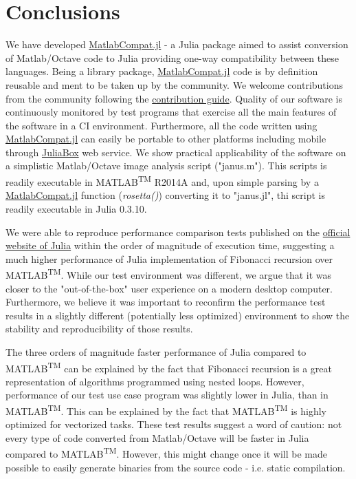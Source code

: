\section{Conclusions}

We have developed \href{https://github.com/MatlabCompat/MatlabCompat.jl}{MatlabCompat.jl} - a Julia package aimed to assist conversion of Matlab/Octave code to Julia providing one-way compatibility between these languages. Being a library package, \href{https://github.com/MatlabCompat/MatlabCompat.jl}{MatlabCompat.jl} code is by definition reusable and ment to be taken up by the community. We welcome contributions from the community following the \href{http://matlabcompat.github.io/contribute.html}{contribution guide}. Quality of our software is continuously monitored by test programs that exercise all the main features of the software in a CI environment. Furthermore, all the code written using \href{https://github.com/MatlabCompat/MatlabCompat.jl}{MatlabCompat.jl} can easily be portable to other platforms including mobile through \href{https://www.juliabox.org/}{JuliaBox} web service. We show practical applicability of the software on a simplistic Matlab/Octave image analysis script ("janus.m"). This scripts is readily executable in MATLAB\textsuperscript{TM} R2014A and, upon simple parsing by a \href{https://github.com/MatlabCompat/MatlabCompat.jl}{MatlabCompat.jl} function (\textit{rosetta()}) converting it to "janus.jl", thi script is readily executable in Julia 0.3.10.

We were able to reproduce performance comparison tests published on the \href{http://julialang.org/benchmarks/}{official website of Julia} within the order of magnitude of execution time, suggesting a much higher performance of Julia implementation of Fibonacci recursion over MATLAB\textsuperscript{TM}. While our test environment was different, we argue that it was closer to the "out-of-the-box" user experience on a modern desktop computer. Furthermore, we believe it was important to reconfirm the performance test results in a slightly different (potentially less optimized) environment to show the stability and reproducibility of those results.

The three orders of magnitude faster performance of Julia compared to MATLAB\textsuperscript{TM} can be explained by the fact that Fibonacci recursion is a great representation of algorithms programmed using nested loops. However, performance of our test use case program was slightly lower in Julia, than in MATLAB\textsuperscript{TM}. This can be explained by the fact that MATLAB\textsuperscript{TM} is highly optimized for vectorized tasks. These test results suggest a word of caution: not every type of code converted from Matlab/Octave will be faster in Julia compared to MATLAB\textsuperscript{TM}. However, this might change once it will be made possible to easily generate binaries from the source code - i.e. static compilation.

